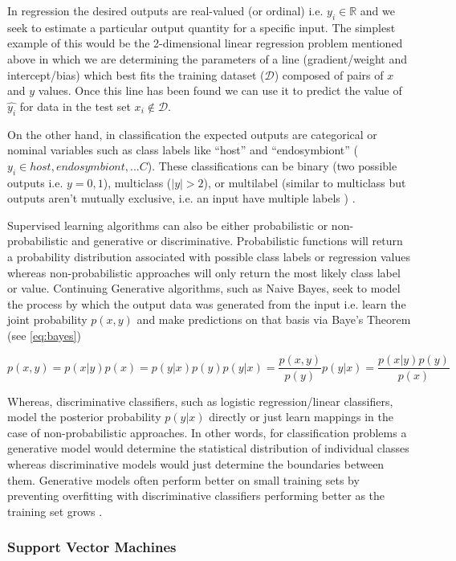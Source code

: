 In regression the desired outputs are real-valued (or ordinal) i.e. \(y_{i} \in \mathbb{R}\) and we seek to
estimate a particular output quantity for a specific input.
The simplest example of this would be the 2-dimensional linear regression problem mentioned above in which
we are determining the parameters of a line (gradient/weight and intercept/bias) which best fits the training 
dataset (\(\mathcal{D}\)) composed of pairs of \(x\) and \(y\) values.  Once this line has been found we 
can use it to predict the value of \(\hat{y_{i}}\) for data in the test set \(x_{i} \not \in \mathcal{D}\).


On the other hand, in classification the expected outputs are 
categorical or nominal variables such as class labels like ``host'' and ``endosymbiont'' 
(\(y_{i} \in {host, endosymbiont, ... C}\)).  These classifications can be binary (two possible outputs i.e. 
\(y={0,1}\)), multiclass (\(\left\vert{{y}}\right\vert > 2\)),
or multilabel (similar to multiclass but outputs aren't mutually exclusive, i.e. an input have multiple labels
) \citep{Murphy2012}. 

Supervised learning algorithms can also be either probabilistic or non-probabilistic and generative or 
discriminative.
Probabilistic functions will return a probability distribution associated with possible class labels or
regression values whereas non-probabilistic approaches will only return the most likely class label or value.
Continuing 
Generative algorithms, such as Naive Bayes, seek to model the process by which the output data was generated 
from the input i.e. learn the joint probability \(p(x,y)\) and make predictions on that basis via Baye's Theorem (see \ref{eq:bayes}) 

\[
    p(x,y) = p(x|y)p(x) = p(y|x)p(y)
    p(y|x) = \frac{p(x,y)}{p(y)}
    p(y|x) = \frac{p(x|y)p(y)}{p(x)}
    \label{eq:bayes}
\]

Whereas, discriminative classifiers, such as logistic regression/linear classifiers,
model the posterior probability \(p(y|x)\) directly or just learn mappings in the case of non-probabilistic approaches.
In other words, for classification problems a generative model would determine the statistical distribution of 
individual classes whereas discriminative models would just determine the boundaries between them.
Generative models often perform better on small training sets by preventing overfitting with discriminative
classifiers performing better as the training set grows \citep{Ng2002}.

\subsubsection{Support Vector Machines}

